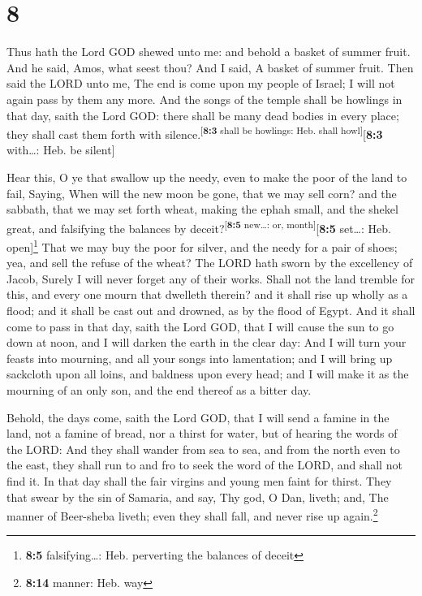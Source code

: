 \hypertarget{section-7}{%
\section{8}\label{section-7}}

 Thus hath the Lord GOD shewed unto me: and behold a
basket of summer fruit.  And he said, Amos, what seest
thou? And I said, A basket of summer fruit. Then said the LORD unto me,
The end is come upon my people of Israel; I will not again pass by them
any more.  And the songs of the temple shall be howlings
in that day, saith the Lord GOD: there shall be many dead bodies in
every place; they shall cast them forth with
silence.\textsuperscript{{[}\textbf{8:3} shall be howlings: Heb. shall
howl{]}}{[}\textbf{8:3} with\ldots: Heb. be silent{]}

 Hear this, O ye that swallow up the needy, even to make
the poor of the land to fail,  Saying, When will the new
moon be gone, that we may sell corn? and the sabbath, that we may set
forth wheat, making the ephah small, and the shekel great, and
falsifying the balances by deceit?\textsuperscript{{[}\textbf{8:5}
new\ldots: or, month{]}}{[}\textbf{8:5} set\ldots: Heb.
open{]}\footnote{\textbf{8:5} falsifying\ldots: Heb. perverting the
  balances of deceit}  That we may buy the poor for
silver, and the needy for a pair of shoes; yea, and sell the refuse of
the wheat?  The LORD hath sworn by the excellency of
Jacob, Surely I will never forget any of their works. 
Shall not the land tremble for this, and every one mourn that dwelleth
therein? and it shall rise up wholly as a flood; and it shall be cast
out and drowned, as by the flood of Egypt.  And it shall
come to pass in that day, saith the Lord GOD, that I will cause the sun
to go down at noon, and I will darken the earth in the clear day:
 And I will turn your feasts into mourning, and all your
songs into lamentation; and I will bring up sackcloth upon all loins,
and baldness upon every head; and I will make it as the mourning of an
only son, and the end thereof as a bitter day.

 Behold, the days come, saith the Lord GOD, that I will
send a famine in the land, not a famine of bread, nor a thirst for
water, but of hearing the words of the LORD:  And they
shall wander from sea to sea, and from the north even to the east, they
shall run to and fro to seek the word of the LORD, and shall not find
it.  In that day shall the fair virgins and young men
faint for thirst.  They that swear by the sin of Samaria,
and say, Thy god, O Dan, liveth; and, The manner of Beer-sheba liveth;
even they shall fall, and never rise up again.\footnote{\textbf{8:14}
  manner: Heb. way}

